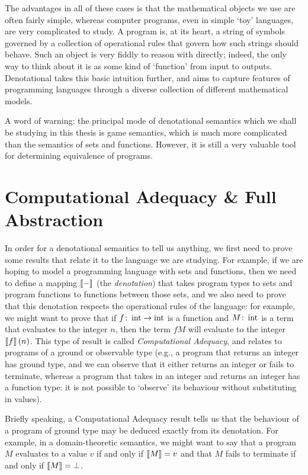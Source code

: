 The advantages in all of these cases is that the mathematical objects we use are often fairly simple, whereas computer programs, even in simple `toy' languages, are very complicated to study. 
A program is, at its heart, a string of symbols governed by a collection of operational rules that govern how such strings should behave. 
Such an object is very fiddly to reason with directly; indeed, the only way to think about it is as some kind of `function' from input to outputs.
Denotational takes this basic intuition further, and aims to capture features of programming languages through a diverse collection of different mathematical models.

A word of warning: the principal mode of denotational semantics which we shall be studying in this thesis is game semantics, which is much more complicated than the semantics of sets and functions. 
However, it is still a very valuable tool for determining equivalence of programs.

\section{Computational Adequacy \& Full Abstraction}
\label{SecCAnFA}

In order for a denotational semantics to tell us anything, we first need to prove some results that relate it to the language we are studying. 
For example, if we are hoping to model a programming language with sets and functions, then we need to define a mapping $\left\llbracket-\right\rrbracket$ (the \emph{denotation}) that takes program types to sets and program functions to functions between those sets, and we also need to prove that this denotation respects the operational rules of the language: for example, we might want to prove that if $f \colon \operatorname{int} \to \operatorname{int}$ is a function and $M \colon \operatorname{int}$ is a term that evaluates to the integer $n$, then the term $f M$ will evaluate to the integer $\left\llbracket f\right\rrbracket(n)$.
This type of result is called \emph{Computational Adequacy}, and relates to programs of a ground or observable type (e.g., a program that returns an integer has ground type, and we can observe that it either returns an integer or fails to terminate, whereas a program that takes in an integer and returns an integer has a function type: it is not possible to `observe' its behaviour without substituting in values).

Briefly speaking, a Computational Adequacy result tells us that the behaviour of a program of ground type may be deduced exactly from its denotation.
For example, in a domain-theoretic semantics, we might want to say that a program $M$ evaluates to a value $v$ if and only if $\left\llbracket M\right\rrbracket=v$ and that $M$ fails to terminate if and only if $\left\llbracket M\right\rrbracket = \bot$.

